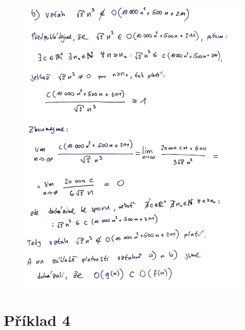 \documentclass[11pt, a4paper, titlepage]{article}
\begin{document}
\begin{figure}[H]
	\begin{center}
		\includegraphics[page=1,scale=0.5]{images/tin-4-2-2.png}
	\end{center}
\end{figure}

\newpage






\section*{Příklad 4}
\end{document}
